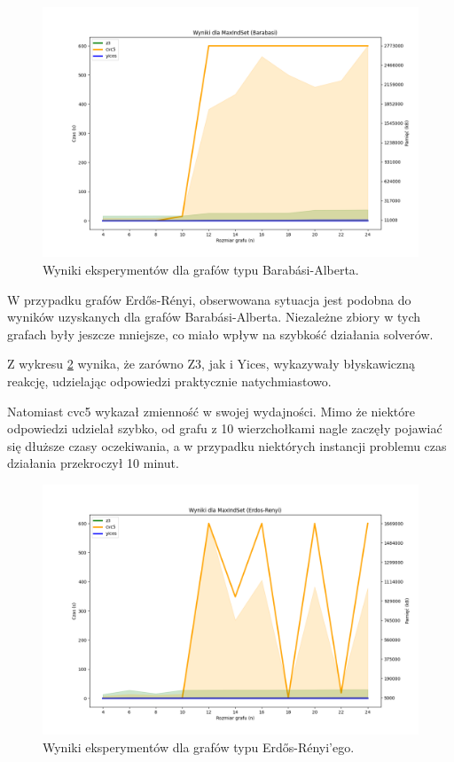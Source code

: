 \begin{figure}[htbp]
	\centering
	\begin{minipage}{\textwidth}
		\includegraphics[width=\textwidth]{./figures/4-barabasi-plot.png}
		\caption{Wyniki eksperymentów dla grafów typu Barabási-Alberta.}
		\label{fig:4-barabasi-plot}
	\end{minipage}
\end{figure}

W przypadku grafów Erdős-Rényi, obserwowana sytuacja jest podobna do wyników uzyskanych dla grafów Barabási-Alberta. Niezależne zbiory w tych grafach były jeszcze mniejsze, co miało wpływ na szybkość działania solverów.

Z wykresu \ref{fig:4-erdos-renyi-plot} wynika, że zarówno Z3, jak i Yices, wykazywały błyskawiczną reakcję, udzielając odpowiedzi praktycznie natychmiastowo.

Natomiast cvc5 wykazał zmienność w swojej wydajności. Mimo że niektóre odpowiedzi udzielał szybko, od grafu z 10 wierzchołkami nagle zaczęły pojawiać się dłuższe czasy oczekiwania, a w przypadku niektórych instancji problemu czas działania przekroczył 10 minut.

\begin{figure}[htbp]
	\centering
	\begin{minipage}{\textwidth}
		\includegraphics[width=\textwidth]{./figures/4-erdos-renyi-plot.png}
		\caption{Wyniki eksperymentów dla grafów typu Erdős-Rényi'ego.}
		\label{fig:4-erdos-renyi-plot}
	\end{minipage}
\end{figure}

